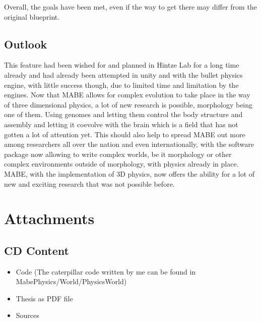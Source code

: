 \documentclass[12pt,oneside,listof=totoc,paper=a4,headings=small]{scrbook}
\begin{document}
Overall, the goals have been met, even if the way to get there may differ from the original blueprint. 
\newpage
\section{Outlook}
This feature had been wished for and planned in Hintze Lab for a long time already and had already been attempted in unity and with the bullet physics engine, with little success though, due to limited time and limitation by the engines. 
\newline Now that MABE allows for complex evolution to take place in the way of three dimensional physics, a lot of new research is possible, morphology being one of them. Using genomes and letting them control the body structure and assembly and letting it coevolve with the brain which is a field that has not gotten a lot of attention yet.
\newline This should also help to spread MABE out more among researchers all over the nation and even internationally, with the software package now allowing to write complex worlds, be it morphology or other complex environments outside of morphology, with physics already in place.
\newline MABE, with the implementation of 3D physics, now offers the ability for a lot of new and exciting research that was not possible before. 



\backmatter





\newpage
\chapter{Attachments}
\section{CD Content}
\begin{itemize}
  \item Code (The caterpillar code written by me can be found in MabePhysics/World/PhysicsWorld)
  \item Thesis as PDF file
  \item Sources
\end{itemize}



\newpage
\thispagestyle{empty}
\end{document}
